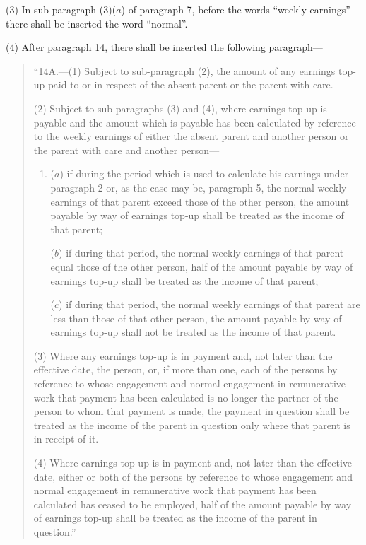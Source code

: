 \documentclass[12pt,a4paper]{article}
\begin{document}
(3) In sub-paragraph (3)($a$) of paragraph 7, before the words “weekly earnings” there shall be inserted the word “normal”.

(4) After paragraph 14, there shall be inserted the following paragraph—
\begin{quotation}
“14A.—(1) Subject to sub-paragraph (2), the amount of any earnings top-up paid to or in respect of the absent parent or the parent with care.

(2) Subject to sub-paragraphs (3) and (4), where earnings top-up is payable and the amount which is payable has been calculated by reference to the weekly earnings of either the absent parent and another person or the parent with care and another person—
\begin{enumerate}\item[]
($a$) if during the period which is used to calculate his earnings under paragraph 2 or, as the case may be, paragraph 5, the normal weekly earnings of that parent exceed those of the other person, the amount payable by way of earnings top-up shall be treated as the income of that parent;

($b$) if during that period, the normal weekly earnings of that parent equal those of the other person, half of the amount payable by way of earnings top-up shall be treated as the income of that parent;

($c$) if during that period, the normal weekly earnings of that parent are less than those of that other person, the amount payable by way of earnings top-up shall not be treated as the income of that parent.
\end{enumerate}

(3) Where any earnings top-up is in payment and, not later than the effective date, the person, or, if more than one, each of the persons by reference to whose engagement and normal engagement in remunerative work that payment has been calculated is no longer the partner of the person to whom that payment is made, the payment in question shall be treated as the income of the parent in question only where that parent is in receipt of it.

(4) Where earnings top-up is in payment and, not later than the effective date, either or both of the persons by reference to whose engagement and normal engagement in remunerative work that payment has been calculated has ceased to be employed, half of the amount payable by way of earnings top-up shall be treated as the income of the parent in question.”
\end{quotation}
\end{document}
